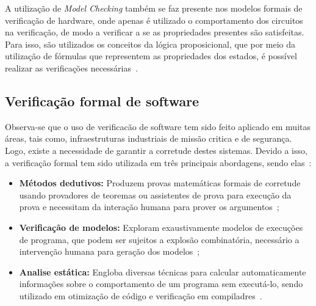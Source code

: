 \par
A utilização de \textit{Model Checking} também se faz presente nos modelos formais de verificação de hardware, onde apenas é utilizado o comportamento dos circuitos na verificação, de modo a verificar a se as propriedades  presentes são satisfeitas. Para isso, são utilizados os conceitos da lógica proposicional, que por meio da utilização de fórmulas que representem as propriedades dos estados, é possível realizar as verificações necessárias~\cite{seger1992introduction}.

 
\subsection{Verificação formal de software}

Observa-se que o uso de verificacão de software tem sido feito aplicado em muitas áreas, tais como, infraestruturas industriais de missão critica e de segurança.  Logo, existe a necessidade de garantir a corretude destes sistemas. Devido a isso, a verificação formal tem sido utilizada em três principais abordagens, sendo elas~\cite{cousot2010gentle,d2008survey}:


\begin{itemize}
 \item \textbf{Métodos dedutivos:} Produzem provas matemáticas formais de corretude usando provadores de teoremas ou assistentes de prova para execução da prova e necessitam da interação humana para prover os argumentos~\cite{cousot2010gentle};
  \item \textbf{Verificação de modelos:} Exploram exaustivamente modelos de execuções de programa, que podem ser sujeitos a explosão combinatória, necessário a intervenção humana para geração dos modelos~\cite{rocha2015verificaccao};
  \item \textbf{Analise estática:} Engloba diversas técnicas para calcular automaticamente informações sobre o comportamento de um programa sem executá-lo, sendo utilizado em otimização de código e verificação em compiladres~\cite{d2008survey}.
\end{itemize}

